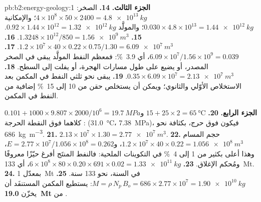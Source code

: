 \begin{solution}{pb:b2:energy-geology:1}
\noindent\textbf{الجزء الثالث.}
\textbf{14.} الصخر: $4 \times 10^8 \times 50 \times 2400 = \qty{4.8e13}{kg}$؛ والإمكانية $0.030
\times 4.8 \times 10^{13} = \qty{1.44e12}{kg}$؛ والمولَّد $0.92 \times 1.44 \times 10^{12} =
\qty{1.32e12}{kg}$.
\textbf{15.} $1.3248 \times 10^{12}/850 = \qty{1.56e9}{m^3}$.
\textbf{16.} $1.2 \times 10^7 \times 40 \times 0.22 \times 0.75/1.30 = \qty{6.09e7}{m^3}$.
\textbf{17.} $6.09 \times 10^7/1.56 \times 10^9 = 0.039$، أي \qty{3.9}{\percent}: فمعظم النفط المولَّد
يبقى في الصخر المصدر، أو يضيع على طول مسارات الهجرة، أو يفلت إلى السطح.
\textbf{18.} $0.35 \times 6.09 \times 10^7 = \qty{2.13e7}{m^3}$.
\textbf{19.} يبقى نحو ثلثي النفط في المكمن بعد الاستخلاص الأوّلي والثانوي؛
ويمكن أن يستخلص حقن  من 10 إلى \qty{15}{\percent} إضافية من النفط في المكمن.

\noindent\textbf{الجزء الرابع.}
\textbf{20.} $15 + 25 \times 2 = \qty{65}{\celsius}$ و$0.101 + 1000 \times 9.807 \times 2000/10^6
= \qty{19.7}{MPa}$: كلاهما فوق النقطة الحرجة (\qty{31.0}{\celsius}، \qty{7.38}{MPa})، فيكون
 فوق حرج، بكثافة نحو \qty{686}{kg.m^{-3}}.
\textbf{21.} $2.13 \times 10^7 \times 1.30 = \qty{2.77e7}{m^3}$.
\textbf{22.} حجم المسام $1.2 \times 10^7 \times 40 \times 0.22 = \qty{1.056e8}{m^3}$، و$E =
2.77 \times 10^7/1.056 \times 10^8 = 0.262$، وهذا أعلى بكثير من 1 إلى \qty{4}{\percent} في التكوينات
الملحية: فالنفط المنتَج أفرغ حيّزًا معروفًا ومُحكم الإغلاق.
\textbf{23.} $6 \times 10^8 \times 80 \times 0.20 \times 691 \times 0.02 = \qty{1.33e11}{kg}$،
أي \qty{133}{Mt}.
\textbf{24.} بمعدّل \qty{1}{Mt} في السنة، نحو 133 سنة.
\textbf{25.} $M = \rho\,N_p\,B_o = 686 \times 2.77 \times 10^7 = \qty{1.90e10}{kg}$: يستطيع المكمن
المستنفَد أن يخزّن \textbf{\qty[text-series-to-math=true]{19.0}{Mt}} من .
\end{solution}
